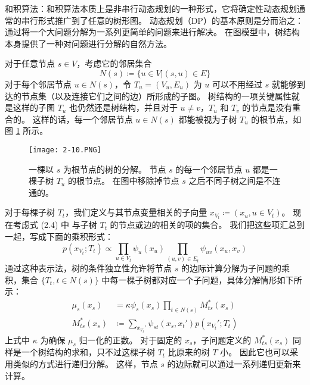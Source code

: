 和积算法：和积算法本质上是非串行动态规划的一种形式，它将确定性动态规划通常的串行形式推广到了任意的树形图。
动态规划（DP）的基本原则是分而治之：通过将一个大问题分解为一系列更简单的问题来进行解决。
在图模型中，树结构本身提供了一种对问题进行分解的自然方法。

对于任意节点 $s \in V$，考虑它的邻居集合
\begin{equation}
    N(s) \coloneqq \{u \in V| (s, u) \in E\}
\end{equation}
对于每个邻居节点 $u \in N(s)$，令 $T_u = (V_u, E_u)$ 为 $u$ 可以不用经过 $s$ 就能够到达的节点集（以及连接它们之间的边）所形成的子图。
树结构的一项关键属性就是这样的子图 $T_u$ 也仍然还是树结构，并且对于 $u \neq v$，$T_u$ 和 $T_v$ 的节点是没有重合的。
这样的话，每一个邻居节点 $u \in N(s)$ 都能被视为子树 $T_u$ 的根节点，如图 \ref{fig:2-10} 所示。

\begin{figure}[htbp]
    \centering
    \texttt{[image: 2-10.PNG]}
    \caption{
        一棵以 $s$ 为根节点的树的分解。
        节点 $s$ 的每一个邻居节点 $u$ 都是一棵子树 $T_u$ 的根节点。
        在图中移除掉节点 $s$ 之后不同子树之间是不连通的。
    }\label{fig:2-10}
\end{figure}

对于每棵子树 $T_t$，我们定义与其节点变量相关的子向量 $x_{V_t} \coloneqq (x_u, u \in V_t)$。
现在考虑式 (2.4) 中 与子树 $T_t$ 的节点或边的相关的项的集合。
我们把这些项汇总到一起，写成下面的乘积形式：
\begin{equation}
    p(x_{V_t}; T_t) \propto \prod_{u \in V_t}\psi_u(x_u)\prod_{(u, v) \in E_t}\psi_{uv}(x_u, x_v)
\end{equation}
通过这种表示法，树的条件独立性允许将节点 $s$ 的边际计算分解为子问题的乘积，集合 $\{T_t, t \in N(s)\}$ 中每一棵子树都对应一个子问题，具体分解情形如下所示：
\begin{subequations}
\begin{align}
    \mu_s(x_s) &= \kappa\psi_s(x_s)\prod_{t \in N(s)}M_{ts}^*(x_s) \\
    M_{ts}^*(x_s) &\coloneqq \sum_{x_{V_t}'}\psi_{st}(x_s, x_t')p(x_{V_t}'; T_t)
\end{align}
\end{subequations}
上式中 $\kappa$ 为确保 $\mu_s$ 归一化的正数。
对于固定的 $x_s$，子问题定义的 $M_{ts}^*(x_s)$ 同样是一个树结构的求和，只不过这棵子树 $T_t$ 比原来的树 $T$ 小。
因此它也可以采用类似的方式进行递归分解。
这样，节点 $s$ 的边际就可以通过一系列递归更新来计算。

